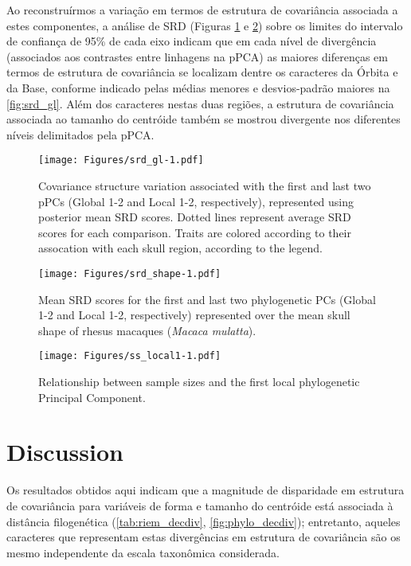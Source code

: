 \documentclass[12pt,twoside]{report}
\begin{document}
Ao reconstruírmos a variação em termos de estrutura de covariância
associada a estes componentes, a análise de SRD (Figuras
\ref{fig:srd_gl} e \ref{fig:srd_shape}) sobre os limites do intervalo de
confiança de 95\% de cada eixo indicam que em cada nível de divergência
(associados aos contrastes entre linhagens na pPCA) as maiores
diferenças em termos de estrutura de covariância se localizam dentre os
caracteres da Órbita e da Base, conforme indicado pelas médias menores e
desvios-padrão maiores na \autoref{fig:srd_gl}. Além dos caracteres
nestas duas regiões, a estrutura de covariância associada ao tamanho do
centróide também se mostrou divergente nos diferentes níveis delimitados
pela pPCA.

\begin{figure}[htbp]
\centering
\texttt{[image: Figures/srd\_gl-1.pdf]}
\caption{Covariance structure variation associated with the first and
last two pPCs (Global 1-2 and Local 1-2, respectively), represented
using posterior mean SRD scores. Dotted lines represent average SRD
scores for each comparison. Traits are colored according to their
assocation with each skull region, according to the legend.
\label{fig:srd_gl}}
\end{figure}

\begin{figure}[htbp]
\centering
\texttt{[image: Figures/srd\_shape-1.pdf]}
\caption{Mean SRD scores for the first and last two phylogenetic PCs
(Global 1-2 and Local 1-2, respectively) represented over the mean skull
shape of rhesus macaques (\emph{Macaca mulatta}). \label{fig:srd_shape}}
\end{figure}

\begin{figure}[htbp]
\centering
\texttt{[image: Figures/ss\_local1-1.pdf]}
\caption{Relationship between sample sizes and the first local
phylogenetic Principal Component. \label{fig:ss_local1}}
\end{figure}

\section{Discussion}\label{discussion-2}

Os resultados obtidos aqui indicam que a magnitude de disparidade em
estrutura de covariância para variáveis de forma e tamanho do centróide
está associada à distância filogenética (\autoref{tab:riem_decdiv},
\autoref{fig:phylo_decdiv}); entretanto, aqueles caracteres que
representam estas divergências em estrutura de covariância são os mesmo
independente da escala taxonômica considerada.
\end{document}
